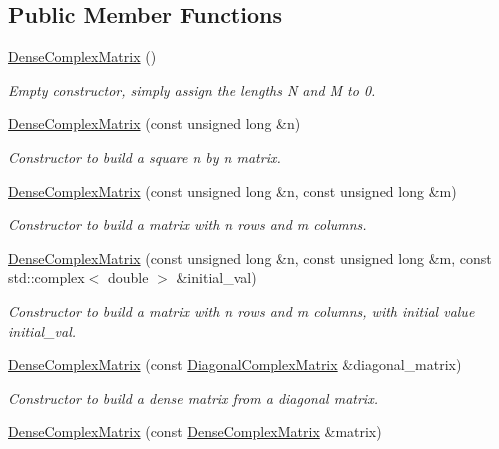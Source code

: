 \subsection*{Public Member Functions}
\begin{DoxyCompactItemize}
\item 
\hyperlink{classoomph_1_1DenseComplexMatrix_ad199664c8603ef3da91c76c3347d84d4}{Dense\+Complex\+Matrix} ()
\begin{DoxyCompactList}\small\item\em Empty constructor, simply assign the lengths N and M to 0. \end{DoxyCompactList}\item 
\hyperlink{classoomph_1_1DenseComplexMatrix_ac716f53db14021238edef4e385f6b319}{Dense\+Complex\+Matrix} (const unsigned long \&n)
\begin{DoxyCompactList}\small\item\em Constructor to build a square n by n matrix. \end{DoxyCompactList}\item 
\hyperlink{classoomph_1_1DenseComplexMatrix_ab17bdf75fb6cec1bbae74a0abac8e69a}{Dense\+Complex\+Matrix} (const unsigned long \&n, const unsigned long \&m)
\begin{DoxyCompactList}\small\item\em Constructor to build a matrix with n rows and m columns. \end{DoxyCompactList}\item 
\hyperlink{classoomph_1_1DenseComplexMatrix_a88144ac8dc64438f77b2aec56b283e87}{Dense\+Complex\+Matrix} (const unsigned long \&n, const unsigned long \&m, const std\+::complex$<$ double $>$ \&initial\+\_\+val)
\begin{DoxyCompactList}\small\item\em Constructor to build a matrix with n rows and m columns, with initial value initial\+\_\+val. \end{DoxyCompactList}\item 
\hyperlink{classoomph_1_1DenseComplexMatrix_a4553b48119e3b4dc1070f0ad9ce98e91}{Dense\+Complex\+Matrix} (const \hyperlink{classoomph_1_1DiagonalComplexMatrix}{Diagonal\+Complex\+Matrix} \&diagonal\+\_\+matrix)
\begin{DoxyCompactList}\small\item\em Constructor to build a dense matrix from a diagonal matrix. \end{DoxyCompactList}\item 
\hyperlink{classoomph_1_1DenseComplexMatrix_a45eecfd3892ddb98b3b0b06f1124ae64}{Dense\+Complex\+Matrix} (const \hyperlink{classoomph_1_1DenseComplexMatrix}{Dense\+Complex\+Matrix} \&matrix)

\end{DoxyCompactItemize}
